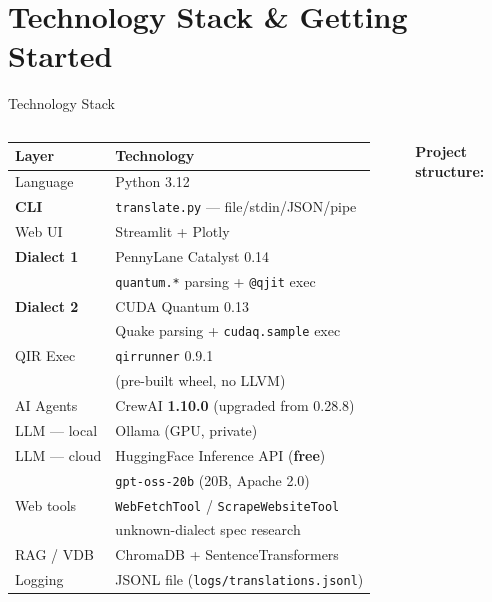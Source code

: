 \documentclass[aspectratio=169,10pt]{beamer}
\newcommand{\hl}[1]{\textcolor{mlirblue}{\textbf{#1}}}
\newcommand{\hlq}[1]{\textcolor{quakegold}{\textbf{#1}}}
\begin{document}
\section{Technology Stack \& Getting Started}

\begin{frame}{Technology Stack}
  \begin{columns}[T]
      \begin{tabular}{@{}lp{4.2cm}@{}}
        \toprule
        Layer & Technology \\
        \midrule
        Language & Python 3.12 \\[2pt]
        \textbf{CLI} & \texttt{translate.py} --- file/stdin/JSON/pipe \\[2pt]
        Web UI & Streamlit + Plotly \\[2pt]
        \hl{Dialect 1} & PennyLane Catalyst 0.14\\
                       & \texttt{quantum.*} parsing + \texttt{@qjit} exec \\[2pt]
        \hlq{Dialect 2} & CUDA Quantum 0.13\\
                        & Quake parsing + \texttt{cudaq.sample} exec \\[2pt]
        QIR Exec & \texttt{qirrunner} 0.9.1 \\
                 & (pre-built wheel, no LLVM) \\[2pt]
        AI Agents & CrewAI \textbf{1.10.0} (upgraded from 0.28.8) \\[2pt]
        LLM --- local & Ollama (GPU, private) \\[2pt]
        LLM --- cloud & HuggingFace Inference API (\textbf{free})\\
                      & \texttt{gpt-oss-20b} (20B, Apache 2.0) \\[2pt]
        Web tools & \texttt{WebFetchTool} / \texttt{ScrapeWebsiteTool}\\
                  & unknown-dialect spec research \\[2pt]
        RAG / VDB & ChromaDB + SentenceTransformers \\[2pt]
        Logging & JSONL file (\texttt{logs/translations.jsonl}) \\
        \bottomrule
      \end{tabular}
      \textbf{Project structure:}
      \vspace{4pt}

\end{columns}
\end{frame}
\end{document}
